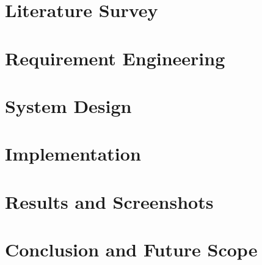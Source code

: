 \documentclass[a4paper,12pt,oneside]{report}
\begin{document}
\chapter{Literature Survey}


\chapter{Requirement Engineering}


\chapter{System Design}


\chapter{Implementation}


\chapter{Results and Screenshots}


\chapter{Conclusion and Future Scope}


\nocite{*}


\end{document}
